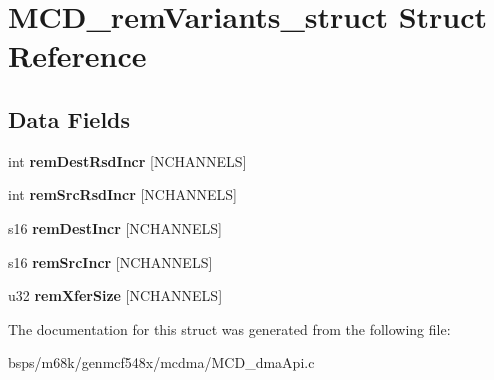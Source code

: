 \hypertarget{structMCD__remVariants__struct}{}\section{M\+C\+D\+\_\+rem\+Variants\+\_\+struct Struct Reference}
\label{structMCD__remVariants__struct}
\subsection*{Data Fields}
\begin{DoxyCompactItemize}
\item 
\mbox{\label{structMCD__remVariants__struct_aff385d691a5fd2cd91fd33f9b770ecdd}} 
int {\bfseries rem\+Dest\+Rsd\+Incr} \mbox{[}N\+C\+H\+A\+N\+N\+E\+LS\mbox{]}
\item 
\mbox{\label{structMCD__remVariants__struct_a62e0e56592f8faeff4b61149e1af4279}} 
int {\bfseries rem\+Src\+Rsd\+Incr} \mbox{[}N\+C\+H\+A\+N\+N\+E\+LS\mbox{]}
\item 
\mbox{\label{structMCD__remVariants__struct_a08e1ac9cee6b0ffd2cf1d10bd6778e65}} 
s16 {\bfseries rem\+Dest\+Incr} \mbox{[}N\+C\+H\+A\+N\+N\+E\+LS\mbox{]}
\item 
\mbox{\label{structMCD__remVariants__struct_acdc038e2827d93d9a71618753141f27b}} 
s16 {\bfseries rem\+Src\+Incr} \mbox{[}N\+C\+H\+A\+N\+N\+E\+LS\mbox{]}
\item 
\mbox{\label{structMCD__remVariants__struct_a20751b66dd261ba3008086b8cb611a4a}} 
u32 {\bfseries rem\+Xfer\+Size} \mbox{[}N\+C\+H\+A\+N\+N\+E\+LS\mbox{]}
\end{DoxyCompactItemize}


The documentation for this struct was generated from the following file\+:\begin{DoxyCompactItemize}
\item 
bsps/m68k/genmcf548x/mcdma/M\+C\+D\+\_\+dma\+Api.\+c\end{DoxyCompactItemize}
